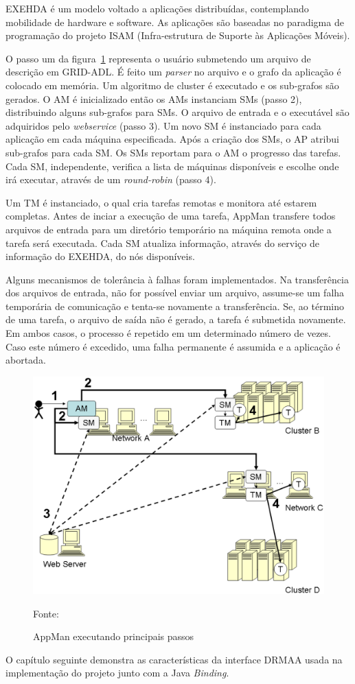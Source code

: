 EXEHDA é um modelo voltado a aplicações distribuídas, contemplando mobilidade de hardware e software. As aplicações são baseadas no paradigma de programação do projeto ISAM (Infra-estrutura de Suporte às Aplicações Móveis).

O passo um da figura~\ref{fig:AppMan} representa o usuário submetendo um arquivo de descrição em GRID-ADL. É feito um \emph{parser} no arquivo e o grafo da aplicação é colocado em memória. Um algoritmo de cluster é executado e os sub-grafos são gerados. O AM é inicializado então os AMs instanciam SMs (passo 2), distribuindo alguns sub-grafos para SMs. O arquivo de entrada e o executável são adquiridos pelo \emph{webservice} (passo 3). Um novo SM é instanciado para cada aplicação em cada máquina especificada. Após a criação dos SMs, o AP atribui sub-grafos para cada SM. Os SMs reportam para o AM o progresso das tarefas. Cada SM, independente, verifica a lista de máquinas disponíveis e escolhe onde irá executar, através de um \emph{round-robin} (passo 4).

Um TM é instanciado, o qual cria tarefas remotas e monitora até estarem completas. Antes de inciar a execução de uma tarefa, AppMan transfere todos arquivos de entrada para um diretório temporário na máquina remota onde a tarefa será executada. Cada SM atualiza informação, através do serviço de informação do EXEHDA, do nós disponíveis. 

Alguns mecanismos de tolerância à falhas foram implementados. Na transferência dos arquivos de entrada, não for possível enviar um arquivo, assume-se um falha temporária de comunicação e tenta-se novamente a transferência. Se, ao término de uma tarefa, o arquivo de saída não é gerado, a tarefa é submetida novamente. Em ambos casos, o processo é repetido em um determinado número de vezes. Caso este número é excedido, uma falha permanente é assumida e a aplicação é abortada.

\begin{figure}[htb]
\begin{center}
\includegraphics[scale=0.13]{./img/AppMan.eps}
\caption{AppMan executando principais passos}
\label{fig:AppMan}
Fonte: \cite{appman}
\end{center}
\end{figure}

O capítulo seguinte demonstra as características da interface DRMAA usada na implementação do projeto junto com a Java \emph{Binding}.